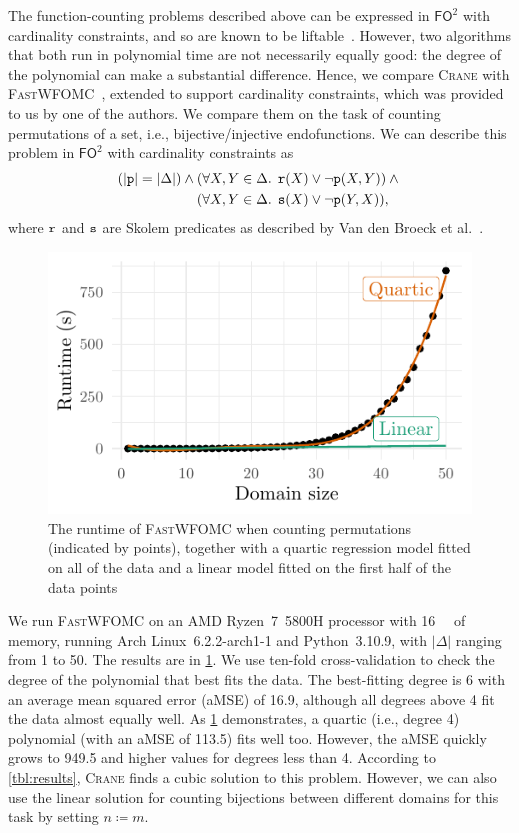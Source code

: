 \documentclass{article}
\newcommand{\FOtwo}{$\mathsf{FO}^{2}$}
\newcommand{\predicate}{\texttt{\textup{p}}}
\newcommand{\predicates}{\texttt{\textup{s}}}
\newcommand{\predicater}{\texttt{\textup{r}}}
\begin{document}
The function-counting problems described above can be expressed in \FOtwo{} with
cardinality constraints, and so are known to be
liftable~\cite{DBLP:journals/jair/Kuzelka21}. However, two algorithms that both
run in polynomial time are not necessarily equally good: the degree of the
polynomial can make a substantial difference. Hence, we compare \textsc{Crane}
with \textsc{FastWFOMC}~\cite{DBLP:conf/uai/BremenK21}, extended to support
cardinality constraints, which was provided to us by one of the authors. We
compare them on the task of counting permutations of a set, i.e.,
bijective/injective endofunctions. We can describe this problem in \FOtwo{} with
cardinality constraints as
\begin{align*}
  (|\predicate| = |\Delta|) \land{} &(\forall X, Y \in \Delta\text{. } \predicater(X) \lor \neg \predicate(X, Y)) \land{}\\
  &(\forall X, Y \in \Delta\text{. } \predicates(X) \lor \neg\predicate(Y, X)),
\end{align*}
where $\predicater$ and $\predicates$ are Skolem predicates as described by Van
den Broeck et al.~.

\begin{figure}[t]
  \includegraphics{plot}
  \caption{The runtime of \textsc{FastWFOMC} when counting permutations
    (indicated by points), together with a quartic regression model fitted on
    all of the data and a linear model fitted on the first half of the data
    points}\label{fig:fastwfomc}
\end{figure}

We run \textsc{FastWFOMC} on an AMD Ryzen~7~5800H processor with
\SI{16}{\giga\byte} of memory, running Arch Linux~6.2.2-arch1-1 and
Python~3.10.9, with $|\Delta|$ ranging from 1 to 50. The results are in
\cref{fig:fastwfomc}. We use ten-fold cross-validation to check the degree of
the polynomial that best fits the data. The best-fitting degree is 6 with an
average mean squared error (aMSE) of 16.9, although all degrees above 4 fit the
data almost equally well. As \cref{fig:fastwfomc} demonstrates, a quartic (i.e.,
degree 4) polynomial (with an aMSE of 113.5) fits well too. However, the aMSE
quickly grows to 949.5 and higher values for degrees less than 4. According to
\cref{tbl:results}, \textsc{Crane} finds a cubic solution to this problem.
However, we can also use the linear solution for counting bijections between
different domains for this task by setting $n \coloneqq m$.
\end{document}
